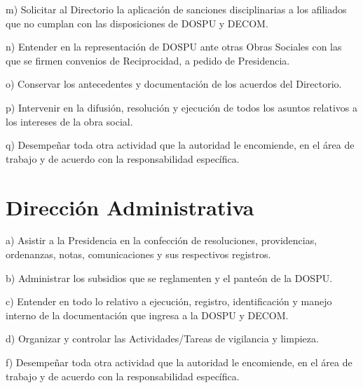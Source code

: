 \begin{displayquote}
m) Solicitar al Directorio la aplicación de sanciones disciplinarias a los afiliados que no cumplan con las disposiciones de DOSPU y DECOM.

n) Entender en la representación de DOSPU ante otras Obras Sociales con las que se firmen convenios de Reciprocidad, a pedido de Presidencia.

o) Conservar los antecedentes y documentación de los acuerdos del Directorio.

p) Intervenir en la difusión, resolución y ejecución de todos los asuntos relativos a los intereses de la obra social.

q) Desempeñar toda otra actividad que la autoridad le encomiende, en el área de trabajo y de
acuerdo con la responsabilidad específica.
\hfill\parencite{CSOrd17}
\end{displayquote}

\section{Dirección Administrativa}
\begin{displayquote}
a) Asistir a la Presidencia en la confección de resoluciones, providencias, ordenanzas, notas, comunicaciones y sus respectivos registros.

b) Administrar los subsidios que se reglamenten y el panteón de la DOSPU.

c) Entender en todo lo relativo a ejecución, registro, identificación y manejo interno de la documentación que ingresa a la DOSPU y DECOM.

d) Organizar y controlar las Actividades/Tareas de vigilancia y limpieza.

f) Desempeñar toda otra actividad que la autoridad le encomiende, en el área de trabajo y de acuerdo con la responsabilidad específica.
\hfill\parencite{CSOrd17}
\end{displayquote}

